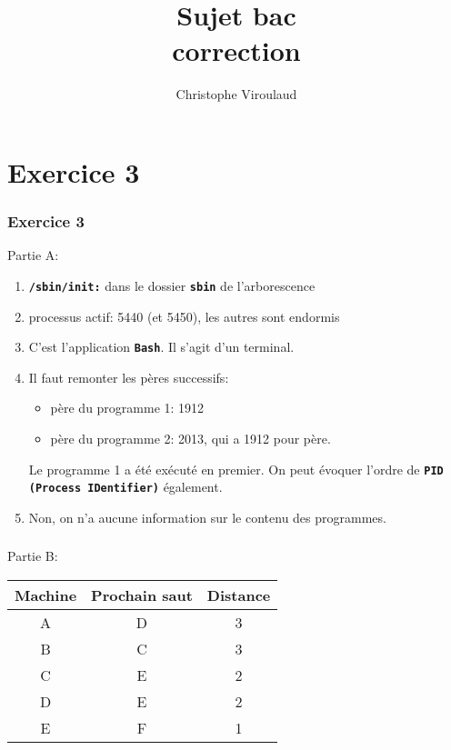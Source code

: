 \documentclass[svgnames,11pt]{beamer}
\author[]{Christophe Viroulaud}
\title{Sujet bac\\correction}
\date{\framebox{\textbf{Archi 17}}}
\institute{Terminale - NSI}
\begin{document}
\begin{frame}
\titlepage
\end{frame}
\section{Exercice 3}
\begin{frame}
    \frametitle{Exercice 3}
Partie A:
\begin{enumerate}
    \item \textbf{\texttt{/sbin/init:}} dans le dossier \textbf{\texttt{sbin}} de l'arborescence
    \item processus actif: 5440 (et 5450), les autres sont endormis
    \item C'est l'application \textbf{\texttt{Bash}}. Il s'agit d'un terminal.
    \item Il faut remonter les pères successifs:
    \begin{itemize}
        \item père du programme 1: 1912
        \item père du programme 2: 2013, qui a 1912 pour père.
    \end{itemize}
    Le programme 1 a été exécuté en premier. On peut évoquer l'ordre de \texttt{\textbf{PID (Process IDentifier)}} également.
    \item Non, on n'a aucune information sur le contenu des programmes.
\end{enumerate}
    

\end{frame}
\begin{frame}
    \frametitle{}

    Partie B:
    \begin{center}
        \begin{tabular}{|*{3}{c|}}
            \hline
            Machine&Prochain saut&Distance\\
            \hline
            A&D&3\\
            \hline
            B&C&3\\
            \hline
            C&E&2\\
            \hline
            D&E&2\\
            \hline
            E&F&1\\
            \hline
        \end{tabular}
    \end{center}

\end{frame}
\end{document}
